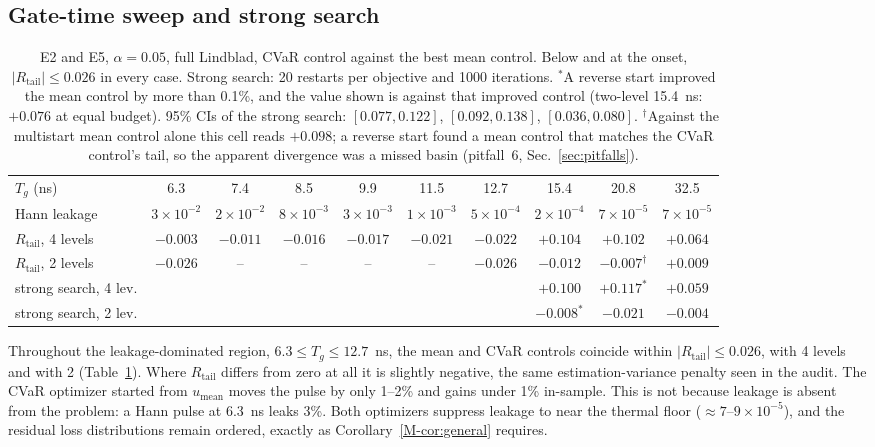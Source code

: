 \documentclass[aps,pra,onecolumn,notitlepage,superscriptaddress,nofootinbib,floatfix]{revtex4-2}
\newcommand{\Rt}{R_{\mathrm{tail}}}
\newcommand{\umean}{u_{\mathrm{mean}}}
\begin{document}
\subsection{Gate-time sweep and strong search}
\label{sec:sweep}
\begin{table}[htbp]
\centering\footnotesize\setlength{\tabcolsep}{3.2pt}
\begin{tabular}{@{}lccccccccc@{}}
\toprule
$T_g$ (ns) & 6.3 & 7.4 & 8.5 & 9.9 & 11.5 & 12.7 & 15.4 & 20.8 & 32.5\\
Hann leakage & $3\!\times\!10^{-2}$ & $2\!\times\!10^{-2}$ & $8\!\times\!10^{-3}$ & $3\!\times\!10^{-3}$ & $1\!\times\!10^{-3}$ & $5\!\times\!10^{-4}$ & $2\!\times\!10^{-4}$ & $7\!\times\!10^{-5}$ & $7\!\times\!10^{-5}$\\
\midrule
$\Rt$, 4 levels & $-0.003$ & $-0.011$ & $-0.016$ & $-0.017$ & $-0.021$ & $-0.022$ & $+0.104$ & $+0.102$ & $+0.064$\\
$\Rt$, 2 levels & $-0.026$ & -- & -- & -- & -- & $-0.026$ & $-0.012$ & $-0.007^{\dagger}$ & $+0.009$\\
\midrule
strong search, 4 lev. & & & & & & & $+0.100$ & $+0.117^{*}$ & $+0.059$\\
strong search, 2 lev. & & & & & & & $-0.008^{*}$ & $-0.021$ & $-0.004$\\
\bottomrule
\end{tabular}
\caption{E2 and E5, $\alpha=0.05$, full Lindblad, CVaR control against the
best mean control. Below and at the onset, $|\Rt|\le0.026$ in every case.
Strong search: 20 restarts per objective and 1000 iterations. $^{*}$A
reverse start improved the mean control by more than 0.1\%, and the value
shown is against that improved control (two-level 15.4~ns: $+0.076$ at equal
budget). 95\% CIs of the strong search:
$[0.077,0.122]$, $[0.092,0.138]$, $[0.036,0.080]$. $^{\dagger}$Against the
multistart mean control alone this cell reads $+0.098$; a reverse start found
a mean control that matches the CVaR control's tail, so the apparent
divergence was a missed basin (pitfall~6, Sec.~\ref{sec:pitfalls}).}
\label{tab:sweep}
\end{table}


Throughout the leakage-dominated region, $6.3\le T_g\le12.7$~ns, the mean and
CVaR controls coincide within $|\Rt|\le0.026$, with 4 levels and with 2
(Table~\ref{tab:sweep}). Where $\Rt$ differs from zero at all it is slightly
negative, the same estimation-variance penalty seen in the audit. The CVaR optimizer started from $\umean$ moves
the pulse by only 1--2\% and gains under 1\% in-sample. This is not because
leakage is absent from the problem: a Hann pulse at 6.3~ns leaks 3\%. Both
optimizers suppress leakage to near the thermal floor
($\approx7$--$9\times10^{-5}$), and the residual loss distributions remain
ordered, exactly as Corollary~\ref{M-cor:general} requires.
\end{document}
